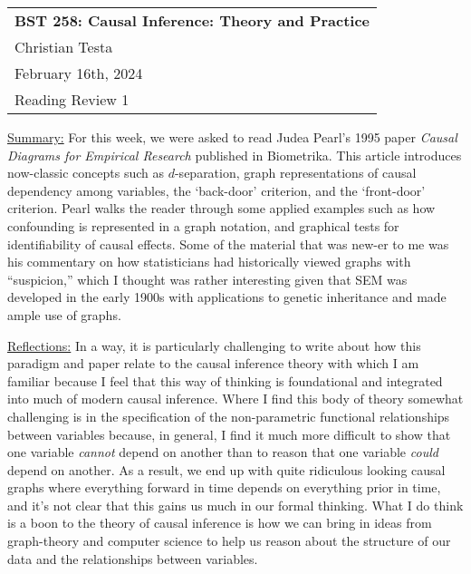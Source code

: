\documentclass[a4paper,11pt]{article}
\begin{document}
\thispagestyle{empty} %

\begin{tabular}{p{6.5in}}  
{\bf BST 258: Causal Inference: Theory and Practice} \\
Christian Testa\\ February 16th, 2024\\
Reading Review 1\\
\hline 
\end{tabular} 

\nocite{*}

\vspace*{0.25in}


\underline{Summary:} For this week, we were asked to read Judea Pearl's 1995 paper \textit{Causal Diagrams for Empirical Research} published in Biometrika. This article introduces
now-classic concepts such as $d$-separation, graph representations of 
causal dependency among variables, the `back-door' criterion, and the 
`front-door' criterion. Pearl walks the reader through some applied
examples such as how confounding is represented in a graph notation, and 
graphical tests for identifiability of causal effects.  Some of the 
material that was new-er to me was his commentary on how statisticians
had historically viewed graphs with ``suspicion,'' which I thought 
was rather interesting given that SEM was developed in the early 1900s 
with applications to genetic inheritance and made ample use of graphs.

\vspace{0.1in}

\underline{Reflections:} In a way, it is particularly challenging to write 
about how this paradigm and paper relate to the causal inference theory 
with which I am familiar because I feel that this way of thinking 
is foundational and integrated into much of modern causal inference.
Where I find this body of theory somewhat challenging is in 
the specification of the non-parametric functional relationships
between variables because, in general, I find it much more difficult
to show that one variable \textit{cannot} depend on another than to reason 
that one variable \textit{could} depend on another.  As a result, we end up 
with quite ridiculous looking causal graphs where everything forward
in time depends on everything prior in time, and it's not clear 
that this gains us much in our formal thinking. What I do think is 
a boon to the theory of causal inference is how we can bring in 
ideas from graph-theory and computer science to help us reason about
the structure of our data and the relationships between variables.
\end{document}
